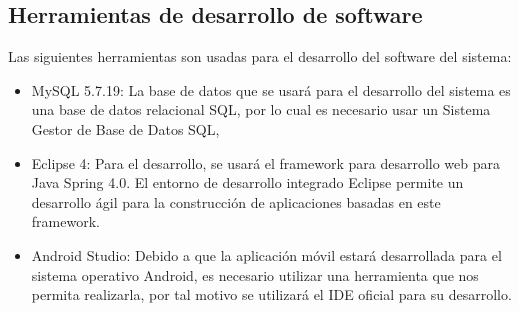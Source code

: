 \subsection{Herramientas de desarrollo de software}
Las siguientes herramientas son usadas para el desarrollo del software del sistema:
\begin{itemize}
	\item MySQL 5.7.19: La base de datos que se usará para el desarrollo del sistema es una base de datos relacional SQL, por lo cual es necesario usar un Sistema Gestor de Base de Datos SQL, 
	\item Eclipse 4: Para el desarrollo, se usará el framework para desarrollo web para Java Spring 4.0. El entorno de desarrollo integrado Eclipse permite un desarrollo ágil para la construcción de aplicaciones basadas en este framework.
	\item Android Studio: Debido a que la aplicación móvil estará desarrollada para el sistema operativo Android, es necesario utilizar una herramienta que nos permita realizarla, por tal motivo se utilizará el IDE oficial para su desarrollo.
\end{itemize}